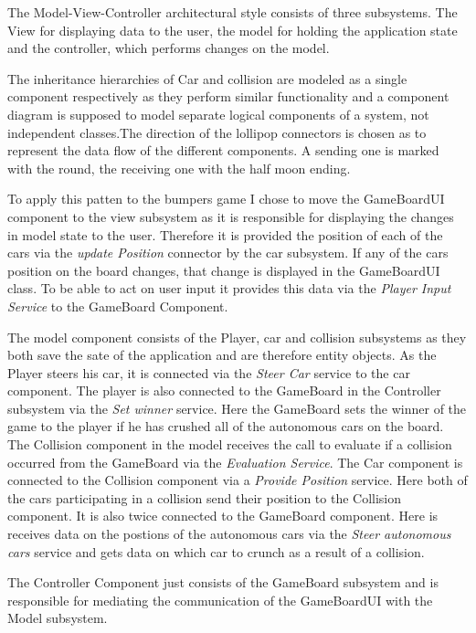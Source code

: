 \documentclass[a4paper, 10pt]{article}
\begin{document}
\begin{enumerate}
    The Model-View-Controller architectural style consists of three subsystems. The View for displaying data
    to the user, the model for holding the application state and the controller, which performs changes on
    the model.

    The inheritance hierarchies of Car and collision are modeled as a single component respectively as 
    they perform similar functionality and a component diagram is supposed to model separate logical components 
    of a system, not independent classes.The direction of the lollipop connectors is chosen as to represent the 
    data flow of the different components. A sending one is marked with the round, the receiving one with 
    the half moon ending.

    To apply this patten to the bumpers game I chose to move the GameBoardUI component to the view subsystem as
    it is responsible for displaying the changes in model state to the user. 
    Therefore it is provided the position of each of the cars via the \textit{update Position} connector by
    the car subsystem. If any of the cars position on the board changes, that change is displayed in the 
    GameBoardUI class. To be able to act on user input it provides this data via the \textit{Player Input Service} 
    to the GameBoard Component.

    The model component consists of the Player, car and collision subsystems as they both save the sate of the application
     and are therefore entity objects. 
     As the Player steers his car, it is 
     connected via the \textit{Steer Car} service to the car component. The player is also connected to the GameBoard in the
     Controller subsystem via the \textit{Set winner} service. Here the GameBoard sets the winner of the game to 
     the player if he has crushed all of the autonomous cars on the board. 
     The Collision component in the model receives the call to evaluate if a collision occurred from the GameBoard via the
     \textit{Evaluation Service}.     
     The Car component is connected to the Collision component via a \textit{Provide Position} service. Here both
    of the cars participating in a collision send their position to the Collision component.
    It is also twice connected to the GameBoard component. Here is receives data on the postions of the autonomous cars 
    via the \textit{Steer autonomous cars} service and gets data on which car to crunch as a result of a collision.

    The Controller Component just consists of the GameBoard subsystem and is responsible for mediating the communication 
    of the GameBoardUI with the Model subsystem.


\end{enumerate}
\end{document}
